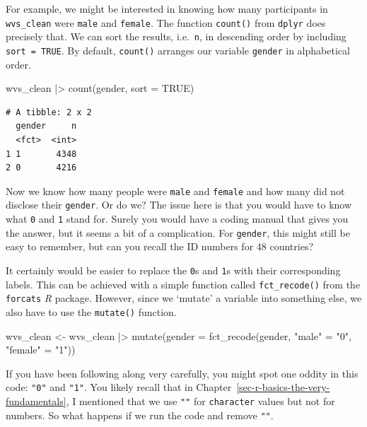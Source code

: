 \documentclass[
  letterpaper,
]{krantz}
\makeatletter
\newenvironment{Shaded}{\begin{snugshade}}{\end{snugshade}}
\newcommand{\AttributeTok}[1]{\textcolor[rgb]{0.40,0.45,0.13}{#1}}
\newcommand{\ConstantTok}[1]{\textcolor[rgb]{0.56,0.35,0.01}{#1}}
\newcommand{\FunctionTok}[1]{\textcolor[rgb]{0.28,0.35,0.67}{#1}}
\newcommand{\NormalTok}[1]{\textcolor[rgb]{0.00,0.23,0.31}{#1}}
\newcommand{\OtherTok}[1]{\textcolor[rgb]{0.00,0.23,0.31}{#1}}
\newcommand{\SpecialCharTok}[1]{\textcolor[rgb]{0.37,0.37,0.37}{#1}}
\newcommand{\StringTok}[1]{\textcolor[rgb]{0.13,0.47,0.30}{#1}}
\newenvironment{kframe}{%
\medskip{}
\setlength{\fboxsep}{.8em}
 \def\at@end@of@kframe{}%
 \ifinner\ifhmode%
  \def\at@end@of@kframe{\end{minipage}}%
  \begin{minipage}{\columnwidth}%
 \fi\fi%
 \def\FrameCommand##1{\hskip\@totalleftmargin \hskip-\fboxsep
 \colorbox{shadecolor}{##1}\hskip-\fboxsep
     \hskip-\linewidth \hskip-\@totalleftmargin \hskip\columnwidth}%
 \MakeFramed {\advance\hsize-\width
   \@totalleftmargin\z@ \linewidth\hsize
   \@setminipage}}%
 {\par\unskip\endMakeFramed%
 \at@end@of@kframe}
\renewenvironment{Shaded}{\begin{kframe}}{\end{kframe}}
\makeatother
\begin{document}
For example, we might be interested in knowing how many participants in
\texttt{wvs\_clean} were \texttt{male} and \texttt{female}. The function
\texttt{count()} from \texttt{dplyr} does precisely that. We can sort
the results, i.e.~\texttt{n}, in descending order by including
\texttt{sort\ =\ TRUE}. By default, \texttt{count()} arranges our
variable \texttt{gender} in alphabetical order.

\begin{Shaded}
\begin{Highlighting}[]
\NormalTok{wvs\_clean }\SpecialCharTok{|\textgreater{}} \FunctionTok{count}\NormalTok{(gender, }\AttributeTok{sort =} \ConstantTok{TRUE}\NormalTok{)}
\end{Highlighting}
\end{Shaded}

\begin{verbatim}
# A tibble: 2 x 2
  gender     n
  <fct>  <int>
1 1       4348
2 0       4216
\end{verbatim}

Now we know how many people were \texttt{male} and \texttt{female} and
how many did not disclose their \texttt{gender}. Or do we? The issue
here is that you would have to know what \texttt{0} and \texttt{1} stand
for. Surely you would have a coding manual that gives you the answer,
but it seems a bit of a complication. For \texttt{gender}, this might
still be easy to remember, but can you recall the ID numbers for 48
countries?

It certainly would be easier to replace the \texttt{0}s and \texttt{1}s
with their corresponding labels. This can be achieved with a simple
function called \texttt{fct\_recode()} from the \texttt{forcats}
\emph{R} package. However, since we `mutate' a variable into something
else, we also have to use the \texttt{mutate()} function.

\begin{Shaded}
\begin{Highlighting}[]
\NormalTok{wvs\_clean }\OtherTok{\textless{}{-}}
\NormalTok{  wvs\_clean }\SpecialCharTok{|\textgreater{}}
  \FunctionTok{mutate}\NormalTok{(}\AttributeTok{gender =} \FunctionTok{fct\_recode}\NormalTok{(gender,}
                             \StringTok{"male"} \OtherTok{=} \StringTok{"0"}\NormalTok{,}
                             \StringTok{"female"} \OtherTok{=} \StringTok{"1"}\NormalTok{))}
\end{Highlighting}
\end{Shaded}

If you have been following along very carefully, you might spot one
oddity in this code: \texttt{"0"} and \texttt{"1"}. You likely recall
that in Chapter~\ref{sec-r-basics-the-very-fundamentals}, I mentioned
that we use \texttt{""} for \texttt{character} values but not for
numbers. So what happens if we run the code and remove \texttt{""}.
\end{document}
